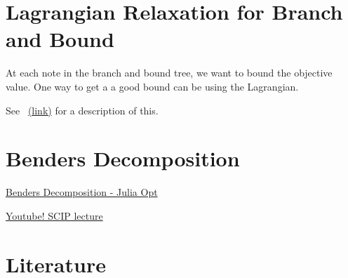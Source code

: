 \section{Lagrangian Relaxation for Branch and Bound}

At each note in the branch and bound tree, we want to bound the objective value.  One way to get a a good bound can be using the Lagrangian. 

\begin{resource}
See~\cite{Fisher2004}  \href{https://my.eng.utah.edu/~kalla/phy_des/lagrange-relax-tutorial-fisher.pdf}{(link)} for a description of this.
\end{resource}


\section{Benders Decomposition}
\begin{resource}
\href{https://www.juliaopt.org/notebooks/Shuvomoy%20-%20Benders%20decomposition.html}{Benders Decomposition - Julia Opt}

\href{https://www.youtube.com/watch?v=8vUNXHwVnC8}{Youtube!  SCIP lecture}
\end{resource}

\section{Literature}



%
